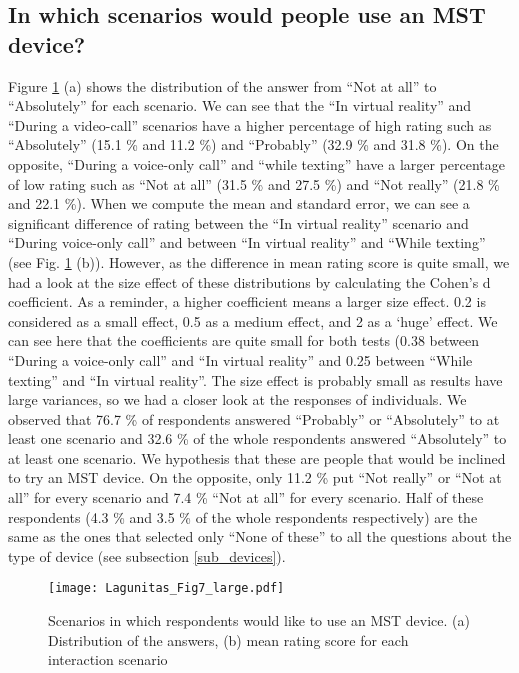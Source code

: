 \documentclass[acmsmall]{acmart}
\begin{document}
\subsection{In which scenarios would people use an MST device?}
Figure \ref{fig_scenario} (a) shows the distribution of the answer from “Not at all” to “Absolutely” for each scenario. We can see that the “In virtual reality” and “During a video-call” scenarios have a higher percentage of high rating such as “Absolutely” (15.1 \% and 11.2 \%) and “Probably” (32.9 \% and 31.8 \%). On the opposite, “During a voice-only call” and “while texting” have a larger percentage of low rating such as “Not at all” (31.5 \% and 27.5 \%) and “Not really” (21.8 \% and 22.1 \%).
When we compute the mean and standard error, we can see a significant difference of rating between the “In virtual reality” scenario and “During voice-only call” and between “In virtual reality” and “While texting” (see Fig. \ref{fig_scenario} (b)). However, as the difference in mean rating score is quite small, we had a look at the size effect of these distributions by calculating the Cohen’s d coefficient. As a reminder, a higher coefficient means a larger size effect. 0.2 is considered as a small effect, 0.5 as a medium effect, and 2 as a ‘huge’ effect. We can see here that the coefficients are quite small for both tests (0.38 between “During a voice-only call” and “In virtual reality” and 0.25 between “While texting” and “In virtual reality”. The size effect is probably small as results have large variances, so we had a closer look at the responses of individuals. 
We observed that 76.7 \% of respondents answered “Probably” or “Absolutely” to at least one scenario and 32.6 \% of the whole respondents answered “Absolutely” to at least one scenario. We hypothesis that these are people that would be inclined to try an MST device. On the opposite, only 11.2 \% put “Not really” or “Not at all” for every scenario and 7.4 \% “Not at all” for every scenario. Half of these respondents (4.3 \% and 3.5 \% of the whole respondents respectively) are the same as the ones that selected only “None of these” to all the questions about the type of device (see subsection \ref{sub_devices}).

\begin{figure}[!t]
	\centering
	\texttt{[image: Lagunitas\_Fig7\_large.pdf]}
	\caption{Scenarios in which respondents would like to use an MST device. (a) Distribution of the answers, (b) mean rating score for each interaction scenario}
	\label{fig_scenario}
\end{figure}
\end{document}
